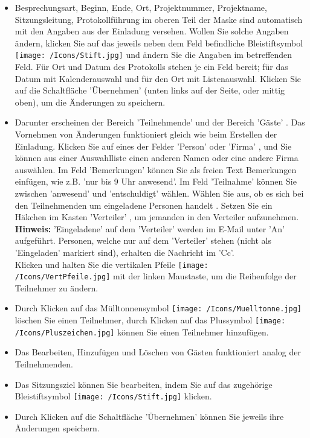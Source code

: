 \begin{itemize}
\item
Besprechungsart, Beginn, Ende, Ort, Projektnummer, Projektname, Sitzungsleitung, Protokollführung im oberen Teil der Maske sind automatisch mit den Angaben aus der Einladung versehen. Wollen Sie solche Angaben ändern, klicken Sie auf das jeweils neben dem Feld befindliche Bleistiftsymbol \texttt{[image: /Icons/Stift.jpg]}  und ändern Sie die Angaben im betreffenden Feld. Für Ort und Datum des Protokolls stehen je ein Feld bereit; für das Datum mit Kalenderauswahl und für den Ort mit Listenauswahl. Klicken Sie auf die Schaltfläche 'Übernehmen'  (unten links auf der Seite, oder mittig oben), um die Änderungen zu speichern.
\item
Darunter erscheinen der Bereich 'Teilnehmende' und der Bereich 'Gäste' . Das Vornehmen von Änderungen funktioniert gleich wie beim Erstellen der Einladung. Klicken Sie auf eines der Felder 'Person'  oder 'Firma' , und Sie können aus einer Auswahlliste einen anderen Namen oder eine andere Firma auswählen. Im Feld 'Bemerkungen'  können Sie als freien Text Bemerkungen einfügen, wie z.B. 'nur bis 9 Uhr anwesend'. Im Feld 'Teilnahme'  können Sie zwischen 'anwesend' und 'entschuldigt' wählen. Wählen Sie aus, ob es sich bei den Teilnehmenden um  eingeladene Personen handelt . Setzen Sie ein Häkchen im Kasten 'Verteiler' , um jemanden in den Verteiler aufzunehmen. \textbf{Hinweis:} 'Eingeladene' auf dem 'Verteiler' werden im E-Mail unter 'An' aufgeführt. Personen, welche nur auf dem 'Verteiler' stehen (nicht als 'Eingeladen' markiert sind), erhalten die Nachricht im 'Cc'.\\
Klicken und halten Sie die vertikalen Pfeile \texttt{[image: /Icons/VertPfeile.jpg]}  mit der linken Maustaste, um die Reihenfolge der Teilnehmer zu ändern.
\item
Durch Klicken auf das Mülltonnensymbol \texttt{[image: /Icons/Muelltonne.jpg]}  löschen Sie einen Teilnehmer, durch Klicken auf das Plussymbol \texttt{[image: /Icons/Pluszeichen.jpg]}  können Sie einen Teilnehmer hinzufügen.
\item
Das Bearbeiten, Hinzufügen und Löschen von Gästen funktioniert analog der Teilnehmenden.
\item
Das Sitzungsziel können Sie bearbeiten, indem Sie auf das zugehörige Bleistiftsymbol \texttt{[image: /Icons/Stift.jpg]}  klicken.
\item
Durch Klicken auf die Schaltfläche 'Übernehmen'  können Sie jeweils ihre Änderungen speichern.
\end{itemize}

